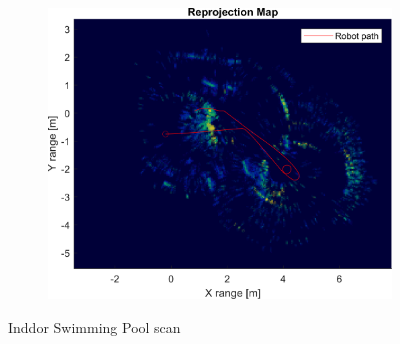 \begin{figure}[htbp]
\begin{subfigure}[t]{0.475\linewidth}
    \end{subfigure}\bigskip\\
    \begin{subfigure}[t]{0.5\linewidth}   
        \centering 
        \includegraphics[width=\linewidth,max height=.475\textheight]{gfx/results/indoorswimmingpool_reprojection.png}
    \end{subfigure}%
    \caption{Inddor Swimming Pool scan}
\end{figure}


